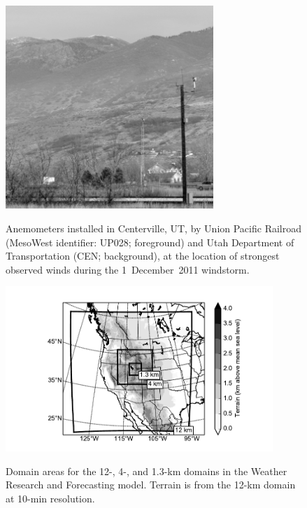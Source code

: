 \documentclass[pdftex,12pt]{article}
\def\MW{\mbox{MesoWest}} %
\begin{document}
\begin{figure}[t]
\centering
\noindent\includegraphics[width=0.7\textwidth]{cen_cenwws_small_crop_BW}\\
\caption{Anemometers installed in Centerville, UT, by Union Pacific Railroad (\MW{} identifier: UP028; foreground) and Utah Department of Transportation (CEN; background), at the location of strongest observed winds during the 1~December~2011 windstorm.}
\label{fig:cenwws}
\end{figure}

\begin{figure}[t]
\centering
\includegraphics[width=0.9\textwidth,angle=0]{domains.pdf}\\
\caption{Domain areas for the 12-, 4-, and 1.3-km domains in the Weather Research and Forecasting model. Terrain is from the 12-km domain at 10-min resolution.}
\label{fig:domains}
\end{figure}
\end{document}

